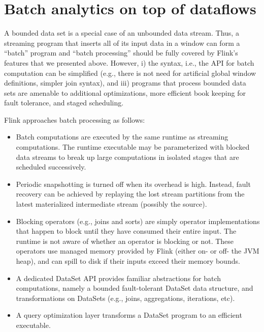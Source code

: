
\section{Batch analytics on top of dataflows}
\label{sec:batch}

A bounded data set is a special case of an unbounded data stream. Thus, a streaming program that inserts all of its input data in a window can form a “batch” program and “batch processing” should be fully covered by Flink’s features that we presented above. However, i) the syntax, i.e., the API for batch computation can be simplified (e.g., there is not need for artificial global window definitions, simpler join syntax), and iii) programs that process bounded data sets are amenable to additional optimizations, more efficient book keeping for fault tolerance, and staged scheduling.

\vspace{2mm}
\noindent Flink approaches batch processing as follows:\vspace{-3mm}
\begin{itemize}
	\item Batch computations are executed by the same runtime as streaming computations. The runtime executable may be parameterized with blocked data streams to break up large computations in isolated stages that are scheduled successively. \vspace{-3mm}
	\item Periodic snapshotting is turned off when its overhead is high. Instead, fault recovery can be achieved by replaying the lost stream partitions from the latest materialized intermediate stream (possibly the source).\vspace{-3mm}
	\item Blocking operators (e.g., joins and sorts) are simply operator implementations that happen to block until they have consumed their entire input. The runtime is not aware of whether an operator is blocking or not. These operators use managed memory provided by Flink (either on- or off- the JVM heap), and can spill to disk if their inputs exceed their memory bounds.\vspace{-3mm}
	\item A dedicated DataSet API provides familiar abstractions for batch computations, namely a bounded fault-tolerant DataSet data structure, and transformations on DataSets (e.g., joins, aggregations, iterations, etc).\vspace{-3mm}
	\item A query optimization layer transforms a DataSet program to an efficient executable.\vspace{-3mm}
\end{itemize}



